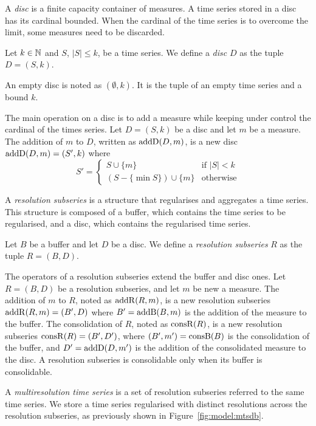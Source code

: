 A \emph{disc} is a finite capacity container of measures. A time
series stored in a disc has its cardinal bounded. When the cardinal of
the time series is to overcome the limit, some measures need to be
discarded.

\begin{definition}[Disc]
  Let $k\in\mathbb{N}$ and $S$, $|S|\leq k$, be a time series. We define a
  \emph{disc} $D$ as the tuple $D=(S,k)$.
\end{definition}

An empty disc is noted as $(\emptyset,k)$. It is the tuple of an empty
time series and a bound $k$.

The main operation on a disc is to add a measure while keeping under
control the cardinal of the times series. Let $D=(S,k)$ be a disc and
let $m$ be a measure.  The addition of $m$ to $D$, written as
$\operatorname{addD}(D,m)$, is a new disc $\operatorname{addD}(D,m)=(S',k)$ where
\[
S' = \begin{cases}
  S\cup\{m\}                 & \text{if } |S|<k  \\
  (S-\{\min S\}) \cup \{m\} & \text{otherwise}
\end{cases}  
\]

A \emph{resolution subseries} is a structure that regularises and
aggregates a time series. This structure is composed of a buffer,
which contains the time series to be regularised, and a disc, which
contains the regularised time series.

\begin{definition}
  Let $B$ be a buffer and let $D$ be a disc.  We define a
  \emph{resolution subseries} $R$ as the tuple $R=(B,D)$.
\end{definition}
 
The operators of a resolution subseries extend the buffer and disc
ones. Let $R=(B,D)$ be a resolution subseries, and let $m$ be new a
measure.  The addition of $m$ to $R$, noted as $\operatorname{addR}(R,m)$, is a new
resolution subseries $\operatorname{addR}(R,m)=(B',D)$ where $B'= \operatorname{addB}(B,m)$ is the
addition of the measure to the buffer.  The consolidation of $R$,
noted as $\operatorname{consR}(R)$, is a new resolution subseries
$\operatorname{consR}(R)=(B',D')$, where $(B',m') = \operatorname{consB}(B)$ is the consolidation
of the buffer, and $D'= \operatorname{addD}(D,m')$ is the addition of the
consolidated measure to the disc. A resolution subseries is
consolidable only when its buffer is consolidable.

A \emph{multiresolution time series} is a set of resolution subseries
referred to the same time series. We store a time series regularised
with distinct resolutions across the resolution subseries, as
previously shown in Figure~\ref{fig:model:mtsdb}.

